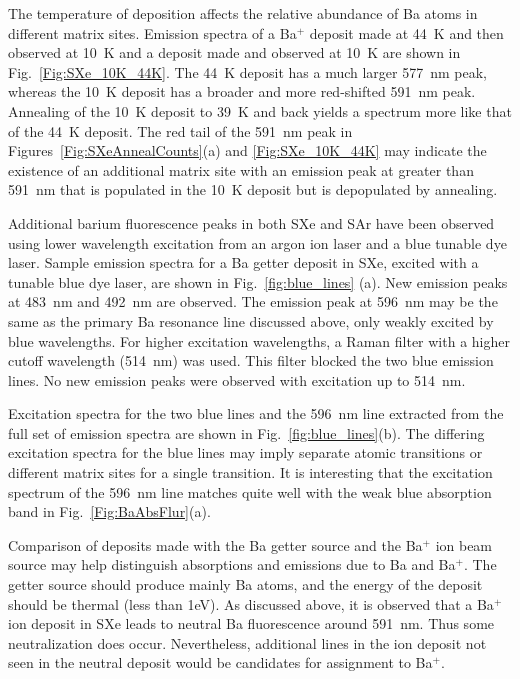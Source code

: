 \documentclass[aps,pra,reprint,superscriptaddress]{revtex4-1}
\begin{document}
The temperature of deposition affects the relative abundance of Ba atoms in different matrix sites.
Emission spectra of a Ba$^+$ deposit made at 44~K and then observed at 10~K and a deposit made and observed at 10~K are shown in Fig.~\ref{Fig:SXe_10K_44K}.
The 44~K deposit has a much larger 577~nm peak, whereas the 10~K deposit has a broader and more red-shifted 591~nm peak.
Annealing of the 10~K deposit to 39~K and back yields a  spectrum more like that of the 44~K deposit.
The red tail of the 591~nm peak in Figures~\ref{Fig:SXeAnnealCounts}(a) and \ref{Fig:SXe_10K_44K}  may indicate the existence of an additional matrix site with an emission peak at greater than 591~nm that is populated in the 10~K deposit but is depopulated by annealing.


Additional barium fluorescence peaks in both SXe and SAr have been observed using lower wavelength excitation from an argon ion laser and a blue tunable dye laser.
Sample emission spectra for a Ba getter deposit in SXe, excited with a tunable blue dye laser, are shown in Fig.~\ref{fig:blue_lines} (a).
New emission peaks at 483~nm and 492~nm are observed.
The emission peak at 596~nm may be the same as the primary Ba resonance line discussed above, only weakly excited by blue wavelengths.
For higher excitation wavelengths, a Raman filter with a higher cutoff wavelength (514~nm) was used.
This filter blocked the two blue emission lines.
No new emission peaks were observed with excitation up to 514~nm.

Excitation spectra for the two blue lines and the 596~nm line extracted from the full set of emission spectra are shown in Fig.~\ref{fig:blue_lines}(b).
The differing excitation spectra for the blue lines may imply separate atomic transitions or different matrix sites for a single transition.
It is interesting that the excitation spectrum of the 596~nm line matches quite well with the weak blue absorption band in Fig.~\ref{Fig:BaAbsFlur}(a). 

Comparison of deposits made with the Ba getter source and the Ba$^+ $ ion beam source may help distinguish absorptions and emissions due to Ba and  Ba$^+ $.
The getter source should produce mainly Ba atoms, and the energy of the deposit should be thermal (less than 1eV).
As discussed above, it is observed that a Ba$^+ $ ion deposit in SXe leads to neutral Ba fluorescence around 591~nm.
Thus some neutralization does occur.
Nevertheless, additional lines in the ion deposit not seen in the neutral deposit would be candidates for assignment to Ba$^+ $.
\end{document}
